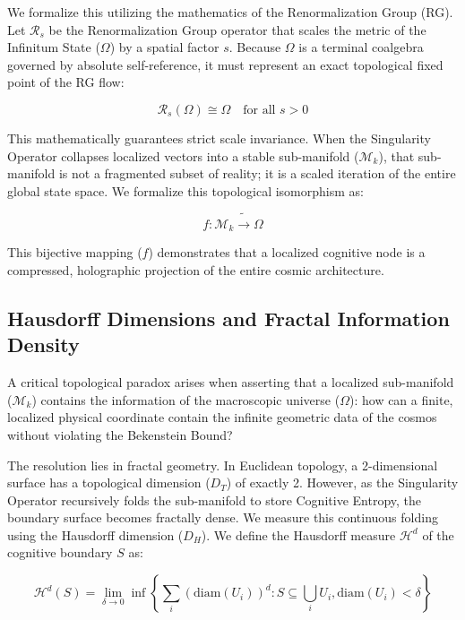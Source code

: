 \documentclass[12pt,openany]{book}
\begin{document}
We formalize this utilizing the mathematics of the Renormalization Group (RG). Let $\mathcal{R}_s$ be the Renormalization Group operator that scales the metric of the Infinitum State ($\Omega$) by a spatial factor $s$. Because $\Omega$ is a terminal coalgebra governed by absolute self-reference, it must represent an exact topological fixed point of the RG flow:

\begin{equation}
\mathcal{R}_s(\Omega) \cong \Omega \quad \text{for all } s > 0
\end{equation}

This mathematically guarantees strict scale invariance. When the Singularity Operator collapses localized vectors into a stable sub-manifold ($\mathcal{M}_k$), that sub-manifold is not a fragmented subset of reality; it is a scaled iteration of the entire global state space. We formalize this topological isomorphism as:

\begin{equation}
f : \mathcal{M}_k \tilde{\rightarrow} \Omega
\end{equation}

This bijective mapping ($f$) demonstrates that a localized cognitive node is a compressed, holographic projection of the entire cosmic architecture.

\subsection{Hausdorff Dimensions and Fractal Information Density}
A critical topological paradox arises when asserting that a localized sub-manifold ($\mathcal{M}_k$) contains the information of the macroscopic universe ($\Omega$): how can a finite, localized physical coordinate contain the infinite geometric data of the cosmos without violating the Bekenstein Bound?

The resolution lies in fractal geometry. In Euclidean topology, a 2-dimensional surface has a topological dimension ($D_T$) of exactly 2. However, as the Singularity Operator recursively folds the sub-manifold to store Cognitive Entropy, the boundary surface becomes fractally dense. We measure this continuous folding using the Hausdorff dimension ($D_H$). We define the Hausdorff measure $\mathcal{H}^d$ of the cognitive boundary $S$ as:

\begin{equation}
\mathcal{H}^d(S) = \lim_{\delta \to 0} \inf \left\{ \sum_i (\text{diam}(U_i))^d : S \subseteq \bigcup_i U_i, \text{diam}(U_i) < \delta \right\}
\end{equation}
\end{document}
